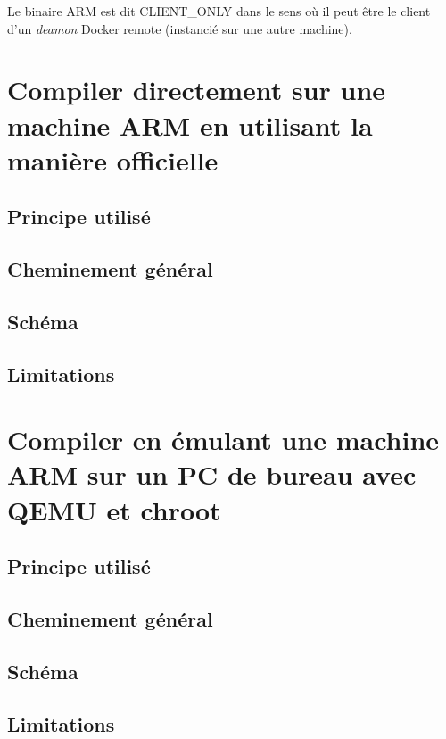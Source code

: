 \documentclass[11pt,a4paper,oneside]{article}
\begin{document}
Le binaire ARM est dit CLIENT\_ONLY dans le sens où il peut être le client d'un \emph{deamon} Docker remote (instancié sur une autre machine).



\section{Compiler directement sur une machine ARM en utilisant la manière officielle}

\subsection{Principe utilisé}

\subsection{Cheminement général}

\subsection{Schéma}

\subsection{Limitations}



\section{Compiler en émulant une machine ARM sur un PC de bureau avec QEMU et chroot}

\subsection{Principe utilisé}

\subsection{Cheminement général}

\subsection{Schéma}

\subsection{Limitations}
\end{document}
